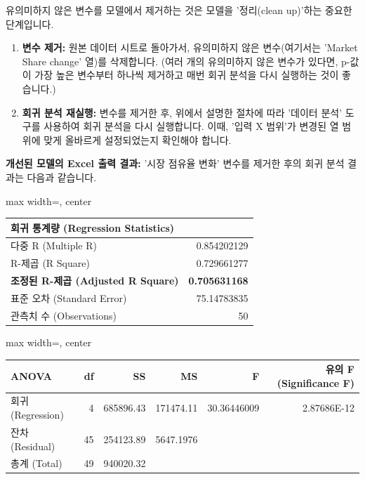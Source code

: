 \documentclass[11pt,a4paper]{book}
\theoremstyle{definition}
\begin{document}
\begin{tcolorbox}[title={\textbf{모델 정리: 유의미하지 않은 변수 제거}}]
유의미하지 않은 변수를 모델에서 제거하는 것은 모델을 '정리(clean up)'하는 중요한 단계입니다.
\begin{enumerate}
    \item \textbf{변수 제거:} 원본 데이터 시트로 돌아가서, 유의미하지 않은 변수(여기서는 'Market Share change' 열)를 삭제합니다. (여러 개의 유의미하지 않은 변수가 있다면, p-값이 가장 높은 변수부터 하나씩 제거하고 매번 회귀 분석을 다시 실행하는 것이 좋습니다.)
    \item \textbf{회귀 분석 재실행:} 변수를 제거한 후, 위에서 설명한 절차에 따라 '데이터 분석' 도구를 사용하여 회귀 분석을 다시 실행합니다. 이때, '입력 X 범위'가 변경된 열 범위에 맞게 올바르게 설정되었는지 확인해야 합니다.
\end{enumerate}

\textbf{개선된 모델의 Excel 출력 결과:}
'시장 점유율 변화' 변수를 제거한 후의 회귀 분석 결과는 다음과 같습니다.

\begin{adjustbox}{max width=\textwidth, center}
\begin{tabular}{l r}
\toprule
\textbf{회귀 통계량 (Regression Statistics)} & \\
\midrule
다중 R (Multiple R) & 0.854202129 \\
R-제곱 (R Square) & 0.729661277 \\
\textbf{조정된 R-제곱 (Adjusted R Square)} & \textbf{0.705631168} \\
표준 오차 (Standard Error) & 75.14783835 \\
관측치 수 (Observations) & 50 \\
\bottomrule
\end{tabular}
\end{adjustbox}

\vspace{0.5em}

\begin{adjustbox}{max width=\textwidth, center}
\begin{tabular}{l r r r r r}
\toprule
\textbf{ANOVA} & \textbf{df} & \textbf{SS} & \textbf{MS} & \textbf{F} & \textbf{유의 F (Significance F)} \\
\midrule
회귀 (Regression) & 4 & 685896.43 & 171474.11 & 30.36446009 & 2.87686E-12 \\
잔차 (Residual) & 45 & 254123.89 & 5647.1976 & & \\
총계 (Total) & 49 & 940020.32 & & & \\
\bottomrule
\end{tabular}
\end{adjustbox}


\end{tcolorbox}
\end{document}
